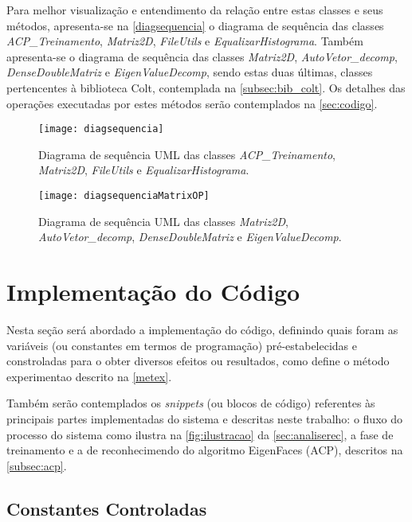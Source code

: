 Para melhor visualização e entendimento da relação entre estas classes e seus métodos, apresenta-se na \autoref{diagsequencia} o diagrama de sequência das classes \textit{ACP\_Treinamento}, \textit{Matriz2D}, \textit{FileUtils} e \textit{EqualizarHistograma}. Também apresenta-se o diagrama de sequência das classes \textit{Matriz2D}, \textit{AutoVetor\_decomp}, \textit{DenseDoubleMatriz} e  \textit{EigenValueDecomp}, sendo estas duas últimas, classes pertencentes à biblioteca Colt, contemplada na \autoref{subsec:bib_colt}. Os detalhes das operações executadas por estes métodos serão contemplados na \autoref{sec:codigo}.


\begin{figure}[h]
	\centering
	\texttt{[image: diagsequencia]}
	\caption{Diagrama de sequência UML  das classes \textit{ACP\_Treinamento}, \textit{Matriz2D}, \textit{FileUtils} e \textit{EqualizarHistograma}.}
	\label{diagsequencia}
\end{figure}


\begin{figure}[h]
	\centering
	\texttt{[image: diagsequenciaMatrixOP]}
	\caption{Diagrama de sequência UML  das classes \textit{Matriz2D}, \textit{AutoVetor\_decomp}, \textit{DenseDoubleMatriz} e  \textit{EigenValueDecomp}.}
	\label{diagsequenciaMatrixOP}
\end{figure}



\section{Implementação do Código}\label{sec:codigo}

Nesta seção será abordado a implementação do código, definindo quais foram as variáveis (ou constantes em termos de programação) pré-estabelecidas e constroladas para o obter diversos efeitos ou resultados, como define o método experimentao descrito na \autoref{metex}.

Também serão contemplados os \textit{snippets} (ou blocos de código) referentes às principais partes implementadas do sistema e descritas neste trabalho: o fluxo do processo do sistema como ilustra na \autoref{fig:ilustracao} da \autoref{sec:analiserec}, a fase de treinamento e a de reconhecimendo do algoritmo EigenFaces (ACP), descritos na \autoref{subsec:acp}.

\subsection{Constantes Controladas}\label{sec:consts}


